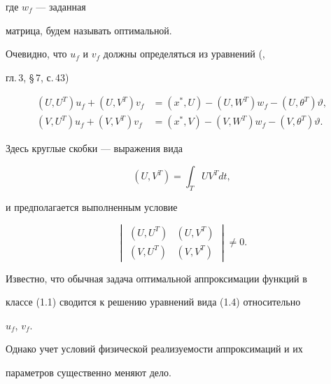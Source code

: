 где $w_f$ --- заданная 


матрица, будем называть оптимальной. 


 


Очевидно, что $u_f$ и $v_f$ должны определяться из уравнений (\cite{1}, 


гл.\,3, \S\,7, с.\,43) 


\begin{equation} 


\begin{split} 


(U,U^T)u_f+(U,V^T)v_f&=(x^*,U)-(U,W^T)w_f- 


(U,\theta^T)\vartheta,\\ 


%


(V,U^T)u_f+(V,V^T)v_f&=(x^*,V)-(V,W^T)w_f- 


(V,\theta^T)\vartheta. 


\end{split} 


\end{equation} 


Здесь круглые скобки --- выражения вида 


$$ 


(U,V^T)=\int_T U V^T dt,


$$ 


и предполагается выполненным условие 


\begin{equation} 


\begin{vmatrix} 


(U,U^T) & (U,V^T) \\ (V,U^T) & (V,V^T) 


\end{vmatrix} 


\ne 0. 


\end{equation} 


 


Известно, что обычная задача оптимальной аппроксимации функций в 


классе (1.1) сводится к решению уравнений вида (1.4) относительно 


$u_f$, $v_f$. 


Однако учет условий физической реализуемости аппроксимаций и их 


параметров существенно меняют дело. 


